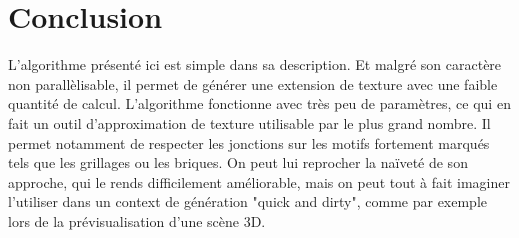 \documentclass{article}
\begin{document}
% 
% 

\section{Conclusion}
L'algorithme présenté ici est simple dans sa description. Et malgré son caractère non parallèlisable, il permet de générer une extension de texture avec une faible quantité de calcul. L'algorithme fonctionne avec très peu de paramètres, ce qui en fait un outil d'approximation de texture utilisable par le plus grand nombre. Il permet notamment de respecter les jonctions sur les motifs fortement marqués tels que les grillages ou les briques. On peut lui reprocher la naïveté de son approche, qui le rends difficilement améliorable, mais on peut tout à fait imaginer l'utiliser dans un context de génération "quick and dirty", comme par exemple lors de la prévisualisation d'une scène 3D.

%





\end{document}
